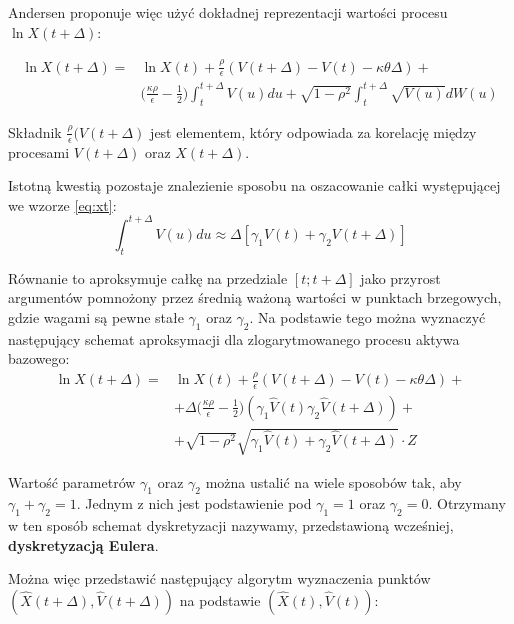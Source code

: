 \documentclass{pracamgr}
\begin{document}
Andersen proponuje więc użyć dokładnej reprezentacji wartości procesu $\ln X(t + \Delta)$:

\begin{equation}
\begin{aligned}
\label{eq:xt}
\ln X(t + \Delta) = & \ln X(t)  + \frac{\rho}{\epsilon} (V(t + \Delta)  - V(t) - \kappa \theta \Delta) + \\
& \Big( \frac{\kappa \rho}{\epsilon} - \frac{1}{2} \Big)
\int_t^{t+\Delta} V(u) du + \sqrt{1-\rho^2} \int_t^{t+\Delta} \sqrt{V(u)}dW(u)
\end{aligned}
\end{equation}

Składnik $\frac{\rho}{\epsilon} (V(t + \Delta)$ jest elementem, który odpowiada za korelację między 
procesami $V(t + \Delta)$ oraz $X(t + \Delta)$.

Istotną kwestią pozostaje znalezienie sposobu na oszacowanie całki występującej we wzorze \ref{eq:xt}:
\begin{equation}
  \int_t^{t+\Delta}  V(u) du \approx \Delta [\gamma_1 V(t) + \gamma_2 V(t + \Delta)]
\end{equation}

Równanie to aproksymuje całkę na przedziale $[t; t + \Delta]$ 
jako przyrost argumentów pomnożony przez średnią ważoną wartości w punktach brzegowych, gdzie wagami 
są pewne stałe $\gamma_1$ oraz $\gamma_2$. Na podstawie tego można wyznaczyć 
następujący schemat aproksymacji dla zlogarytmowanego procesu aktywa bazowego:
\begin{equation}
\begin{aligned}
\label{eq:xhatt}
\ln X(t + \Delta) = & \ln X(t)  + \frac{\rho}{\epsilon} (V(t + \Delta)  - V(t) - \kappa \theta \Delta) + \\
& + \Delta \Big( \frac{\kappa \rho}{\epsilon} - \frac{1}{2} \Big) (\gamma_1 \hat{V}(t) \gamma_2 \hat{V}(t + \Delta)) + \\
& + \sqrt{1-\rho^2} \sqrt{\gamma_1 \hat{V}(t) + \gamma_2 \hat{V}(t + \Delta)} \cdot Z
\end{aligned}
\end{equation}

Wartość parametrów $\gamma_1$ oraz $\gamma_2$ można ustalić na wiele 
sposobów tak, aby $\gamma_1 + \gamma_2 = 1$. 
Jednym z nich jest podstawienie pod $\gamma_1 = 1$ oraz $\gamma_2 = 0$. Otrzymany w ten sposób 
schemat dyskretyzacji nazywamy, przedstawioną wcześniej, \textbf{dyskretyzacją Eulera}.

Można więc przedstawić następujący algorytm wyznaczenia punktów 
$(\hat{X}(t+ \Delta), \hat{V}(t+ \Delta))$ na podstawie $(\hat{X}(t), \hat{V}(t))$:
\end{document}
